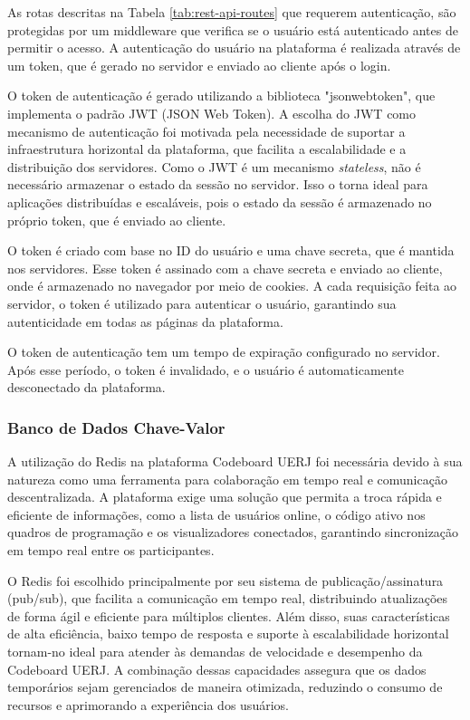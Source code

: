 As rotas descritas na Tabela \ref{tab:rest-api-routes} que requerem autenticação, são protegidas por um middleware que verifica se o usuário está autenticado antes de permitir o acesso. A autenticação do usuário na plataforma é realizada através de um token, que é gerado no servidor e enviado ao cliente após o login. 

O token de autenticação é gerado utilizando a biblioteca "jsonwebtoken", que implementa o padrão JWT (JSON Web Token). A escolha do JWT como mecanismo de autenticação foi motivada pela necessidade de suportar a infraestrutura horizontal da plataforma, que facilita a escalabilidade e a distribuição dos servidores. Como o JWT é um mecanismo \emph{stateless}, não é necessário armazenar o estado da sessão no servidor. Isso o torna ideal para aplicações distribuídas e escaláveis, pois o estado da sessão é armazenado no próprio token, que é enviado ao cliente.

O token é criado com base no ID do usuário e uma chave secreta, que é mantida nos servidores. Esse token é assinado com a chave secreta e enviado ao cliente, onde é armazenado no navegador por meio de cookies. A cada requisição feita ao servidor, o token é utilizado para autenticar o usuário, garantindo sua autenticidade em todas as páginas da plataforma.

O token de autenticação tem um tempo de expiração configurado no servidor. Após esse período, o token é invalidado, e o usuário é automaticamente desconectado da plataforma.


\subsubsection{Banco de Dados Chave-Valor}

A utilização do Redis na plataforma Codeboard UERJ foi necessária devido à sua natureza como uma ferramenta para colaboração em tempo real e comunicação descentralizada. A plataforma exige uma solução que permita a troca rápida e eficiente de informações, como a lista de usuários online, o código ativo nos quadros de programação e os visualizadores conectados, garantindo sincronização em tempo real entre os participantes.

O Redis foi escolhido principalmente por seu sistema de publicação/assinatura (pub/sub), que facilita a comunicação em tempo real, distribuindo atualizações de forma ágil e eficiente para múltiplos clientes. Além disso, suas características de alta eficiência, baixo tempo de resposta e suporte à escalabilidade horizontal tornam-no ideal para atender às demandas de velocidade e desempenho da Codeboard UERJ. A combinação dessas capacidades assegura que os dados temporários sejam gerenciados de maneira otimizada, reduzindo o consumo de recursos e aprimorando a experiência dos usuários.

